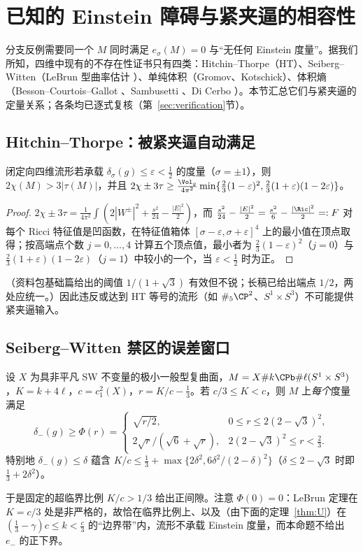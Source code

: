 \section{已知的 Einstein 障碍与紧夹逼的相容性}\label{sec:obstructions}

分支反例需要同一个 $M$ 同时满足 $e_\sigma(M)=0$ 与“无任何 Einstein 度量”。据我们所知，四维中现有的不存在性证书只有四类：Hitchin--Thorpe（HT）、Seiberg--Witten（LeBrun 型曲率估计 \cite{LeBrun01,IL}）、单纯体积（Gromov、Kotschick）、体积熵（Besson--Courtois--Gallot \cite{BCG}、Sambusetti \cite{Sambusetti}、Di Cerbo \cite{DiCerbo}）。本节汇总它们与紧夹逼的定量关系；各条均已逐式复核（第~\ref{sec:verification}节）。

\subsection{Hitchin--Thorpe：被紧夹逼自动满足}
\begin{proposition}\label{prop:HT}
闭定向四维流形若承载 $\delta_\sigma(g)\le\varepsilon<\frac12$ 的度量（$\sigma=\pm1$），则 $2\chi(M)>3|\tau(M)|$，并且 $2\chi\pm3\tau\ge\frac{\Vol_g}{4\pi^2}\min\{\frac23(1-\varepsilon)^2,\frac23(1+\varepsilon)(1-2\varepsilon)\}$。
\end{proposition}
\begin{proof}
$2\chi\pm3\tau=\frac1{4\pi^2}\int(2|W^\pm|^2+\frac{s^2}{24}-\frac{|E|^2}2)$，而 $\frac{s^2}{24}-\frac{|E|^2}{2}=\frac{s^2}6-\frac{|\Ric|^2}2=:F$ 对每个 Ricci 特征值是凹函数，在特征值箱体 $[\sigma-\varepsilon,\sigma+\varepsilon]^4$ 上的最小值在顶点取得；按高端点个数 $j=0,\dots,4$ 计算五个顶点值，最小者为 $\frac23(1-\varepsilon)^2$（$j=0$）与 $\frac23(1+\varepsilon)(1-2\varepsilon)$（$j=1$）中较小的一个，当 $\varepsilon<\frac12$ 时为正。
\end{proof}
（资料包基础篇给出的阈值 $1/(1+\sqrt3)$ 有效但不锐；长稿已给出端点 $1/2$，两处应统一。）因此违反或达到 HT 等号的流形（如 $\#_5\CP^2$、$S^1\times S^3$）不可能提供紧夹逼输入。

\subsection{Seiberg--Witten 禁区的误差窗口}
\begin{proposition}\label{prop:SW}
设 $X$ 为具非平凡 SW 不变量的极小一般型复曲面，$M=X\#k\CPb\#\ell(S^1\times S^3)$，$K=k+4\ell$，$c=c_1^2(X)$，$r=K/c-\frac13$。若 $c/3\le K<c$，则 $M$ 上\emph{每个}度量满足
\[
\delta_-(g)\ge\Phi(r)=\begin{cases}\sqrt{r/2},&0\le r\le2(2-\sqrt3)^2,\\ 2\sqrt r/(\sqrt6+\sqrt r),&2(2-\sqrt3)^2\le r<\frac23.\end{cases}
\]
特别地 $\delta_-(g)\le\delta$ 蕴含 $K/c\le\frac13+\max\{2\delta^2,6\delta^2/(2-\delta)^2\}$（$\delta\le2-\sqrt3$ 时即 $\frac13+2\delta^2$）。
\end{proposition}
于是固定的超临界比例 $K/c>1/3$ 给出正间隙。注意 $\Phi(0)=0$：LeBrun 定理在 $K=c/3$ 处是非严格的，故恰在临界比例上、以及（由下面的定理~\ref{thm:U}）在 $(\frac13-\gamma)c\le k<\frac c3$ 的“边界带”内，流形不承载 Einstein 度量，而本命题不给出 $e_-$ 的正下界。

